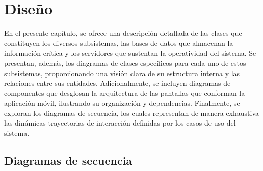 \chapter{Diseño}

En el presente capítulo, se ofrece una descripción detallada de las clases que constituyen los diversos subsistemas, las bases de datos que almacenan la información crítica y los servidores que sustentan la operatividad del sistema. Se presentan, además, los diagramas de clases específicos para cada uno de estos subsistemas, proporcionando una visión clara de su estructura interna y las relaciones entre sus entidades. Adicionalmente, se incluyen diagramas de componentes que desglosan la arquitectura de las pantallas que conforman la aplicación móvil, ilustrando su organización y dependencias. Finalmente, se exploran los diagramas de secuencia, los cuales representan de manera exhaustiva las dinámicas trayectorias de interacción definidas por los casos de uso del sistema.




















\section{Diagramas de secuencia}

